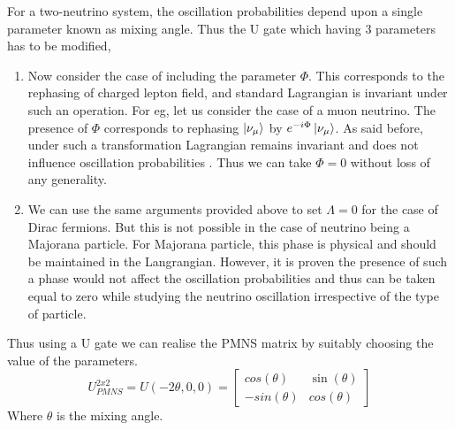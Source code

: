 \documentclass[12pt,a4paper]{report}
\begin{document}
For a two-neutrino system, the oscillation probabilities depend upon a single parameter known as mixing angle. Thus the U gate which having 3 parameters has to be modified,
\begin{enumerate}
	\item Now consider the case of including the parameter $\Phi$. This corresponds to the rephasing of charged lepton field, and standard Lagrangian is invariant under such an operation. For eg, let us consider the case of a muon neutrino. The presence of $\Phi$ corresponds to rephasing $\ket{\nu_{\mu}}$ by $e^{-i\Phi}\ket{\nu_{\mu}}$. As said before, under such a transformation Lagrangian remains invariant and does not influence oscillation probabilities \cite{giunti2007}. Thus we can take $\Phi = 0$ without loss of any generality.
	\item We can use the same arguments provided above to set $\Lambda = 0$ for the case of Dirac fermions\cite{giunti2007}. But this is not possible in the case of neutrino being a Majorana particle. For Majorana particle, this phase is physical and should be maintained in the Langrangian. However, it is proven the presence of such a phase would not affect the oscillation probabilities\cite{giunti2010} and thus can be taken equal to zero while studying the neutrino oscillation irrespective of the type of particle.
\end{enumerate}
Thus using a U gate we can realise the PMNS matrix by suitably choosing the value of the parameters. 
\begin{equation}
\label{eq:16}
U_{PMNS}^{2x2} = U(-2\theta,0,0) = \begin{bmatrix} cos(\theta) & \sin(\theta) \\ -sin(\theta) & 
cos(\theta) \end{bmatrix}
\end{equation}
Where $\theta$ is the mixing angle.\par
\end{document}
